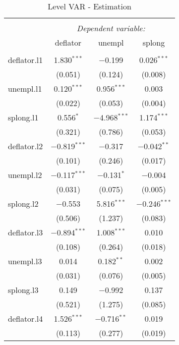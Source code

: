 
\begin{table}[!htbp] \centering 
  \caption{Level VAR - Estimation} 
  \label{tab:est_var_level} 
\small 
\begin{tabular}{@{\extracolsep{5pt}}lccc} 
\\[-1.8ex]\hline 
\hline \\[-1.8ex] 
 & \multicolumn{3}{c}{\textit{Dependent variable:}} \\ 
\cline{2-4} 
 & deflator & unempl & splong \\ 
\hline \\[-1.8ex] 
 deflator.l1 & 1.830$^{***}$ & $-$0.199 & 0.026$^{***}$ \\ 
  & (0.051) & (0.124) & (0.008) \\ 
  unempl.l1 & 0.120$^{***}$ & 0.956$^{***}$ & 0.003 \\ 
  & (0.022) & (0.053) & (0.004) \\ 
  splong.l1 & 0.556$^{*}$ & $-$4.968$^{***}$ & 1.174$^{***}$ \\ 
  & (0.321) & (0.786) & (0.053) \\ 
  deflator.l2 & $-$0.819$^{***}$ & $-$0.317 & $-$0.042$^{**}$ \\ 
  & (0.101) & (0.246) & (0.017) \\ 
  unempl.l2 & $-$0.117$^{***}$ & $-$0.131$^{*}$ & $-$0.004 \\ 
  & (0.031) & (0.075) & (0.005) \\ 
  splong.l2 & $-$0.553 & 5.816$^{***}$ & $-$0.246$^{***}$ \\ 
  & (0.506) & (1.237) & (0.083) \\ 
  deflator.l3 & $-$0.894$^{***}$ & 1.008$^{***}$ & 0.010 \\ 
  & (0.108) & (0.264) & (0.018) \\ 
  unempl.l3 & 0.014 & 0.182$^{**}$ & 0.002 \\ 
  & (0.031) & (0.076) & (0.005) \\ 
  splong.l3 & 0.149 & $-$0.992 & 0.137 \\ 
  & (0.521) & (1.275) & (0.085) \\ 
  deflator.l4 & 1.526$^{***}$ & $-$0.716$^{**}$ & 0.019 \\ 
  & (0.113) & (0.277) & (0.019) \\ 

\end{tabular}
\end{table}
